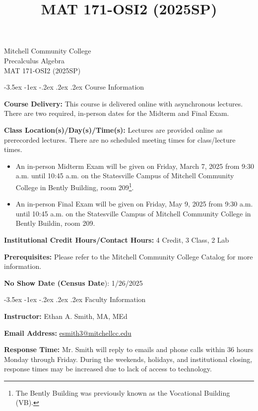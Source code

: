 \documentclass[11pt]{article}
\title{MAT 171-OSI2 (2025SP)}
\makeatletter
\renewcommand\section{\@startsection{section}{1}{0pt}%
  {-3.5ex \@plus -1ex \@minus -.2ex}%
  {.2ex \@plus.2ex}%
  {\normalfont\Large\bfseries}} %
\makeatother
\begin{document}
\begin{center}
    {\huge Mitchell Community College} \\[6pt]
    {\Large Precalculus Algebra} \\[6pt]
    {\Large MAT 171-OSI2 (2025SP)}
\end{center}

\section{Course Information}

\textbf{Course Delivery:} This course is delivered online with asynchronous lectures. There are two required, in-person dates for the Midterm and Final Exam.

\textbf{Class Location(s)/Day(s)/Time(s):} Lectures are provided online as prerecorded lectures. There are no scheduled meeting times for class/lecture times.

\begin{itemize}
\item An in-person Midterm Exam will be given on Friday, March 7, 2025 from 9:30 a.m. until 10:45 a.m. on the Statesville Campus of Mitchell Community College in Bently Building, room 209\footnote{The Bently Building was previously known as the Vocational Building (VB).}.
\item An in-person Final Exam will be given on Friday, May 9, 2025 from 9:30 a.m. until 10:45 a.m. on the Statesville Campus of Mitchell Community College in Bently Buildin, room 209.
\end{itemize}

\textbf{Institutional Credit Hours/Contact Hours:} 4 Credit, 3 Class, 2 Lab

\textbf{Prerequisites:} Please refer to the Mitchell Community College Catalog for more information.

\textbf{No Show Date (Census Date}): 1/26/2025

\section{Faculty Information}

\textbf{Instructor:} Ethan A. Smith, MA, MEd

\textbf{Email Address:} \href{mailto:esmith3@mitchellcc.edu}{esmith3@mitchellcc.edu}

\textbf{Response Time:} Mr. Smith will reply to emails and phone calls within 36 hours Monday through Friday. During the weekends, holidays, and institutional closing, response times may be increased due to lack of access to technology.
\end{document}
